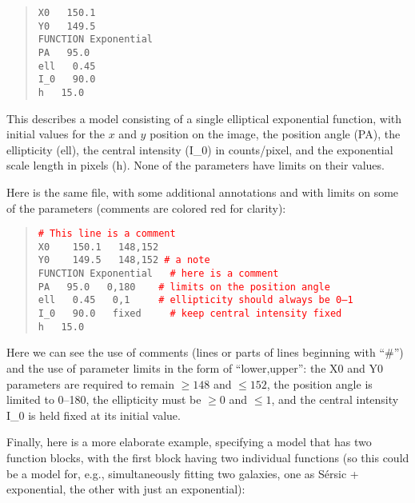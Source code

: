 \documentclass[10pt]{article}
\newcommand{\red}{\textcolor{red}}
\begin{document}
\begin{quote}
  \texttt{X0  ~  150.1}\\
  \texttt{Y0  ~  149.5}\\
  \texttt{FUNCTION   Exponential}\\
  \texttt{PA  ~  95.0}\\
  \texttt{ell  ~  0.45}\\
  \texttt{I\_0 ~  90.0}\\
  \texttt{h   ~  15.0}\\
\end{quote}

This describes a model consisting of a single elliptical exponential
function, with initial values for the $x$ and $y$ position on the image,
the position angle (PA), the ellipticity (ell), the central intensity
(I\_0) in counts/pixel, and the exponential scale length in pixels (h).
None of the parameters have limits on their values.

Here is the same file, with some additional annotations and with limits on
some of the parameters (comments are colored red for clarity):

\begin{quote}
  \texttt{\red{\# This line is a comment}}\\
  
  \texttt{X0 ~~   150.1 ~  148,152}\\
  \texttt{Y0 ~~   149.5 ~  148,152         \red{\# a note}}\\
  \texttt{FUNCTION   Exponential  ~ \red{\# here is a comment}}\\
  \texttt{PA  ~  95.0  ~ 0,180   ~~   \red{\# limits on the position angle}}\\
  \texttt{ell  ~  0.45 ~ 0,1     ~~~ \red{\# ellipticity should always be 0--1}}\\
  \texttt{I\_0 ~  90.0 ~  fixed ~~~ \red{\# keep central intensity fixed}}\\
  \texttt{h    ~ 15.0}\\
\end{quote}

Here we can see the use of comments (lines or parts of lines beginning with
``\#'') and the use of parameter limits in the form of ``lower,upper'': the X0 and Y0 parameters are
required to remain $\geq 148$ and $\leq 152$, the position angle is limited
to 0--180, the ellipticity must be $\geq 0$ and $\leq 1$, and the central
intensity I\_0 is held fixed at its initial value.

Finally, here is a more elaborate example, specifying a model that has
two function blocks, with the first block having two individual
functions (so this could be a model for, e.g., simultaneously fitting
two galaxies, one as S\'ersic + exponential, the other with just an
exponential):
\end{document}
